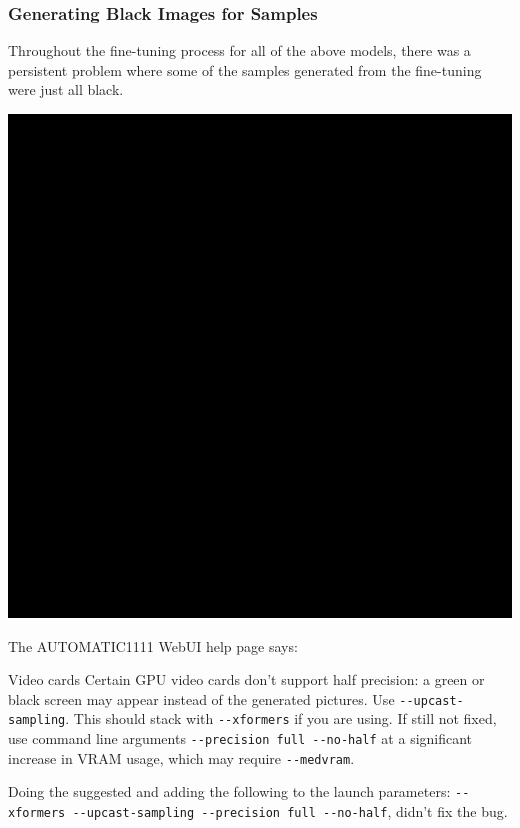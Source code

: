 \documentclass{article}
\begin{document}
\newpage
\subsubsection{Generating Black Images for Samples}
Throughout the fine-tuning process for all of the above models, there was a persistent problem where some of the samples generated from the fine-tuning were just all black.
\begin{center}
    \includegraphics[scale=0.2]{.imgs/bocchi_lora_(2)_4140.png}
\end{center}
The AUTOMATIC1111 WebUI help page says:
\begin{tcolorbox}
Video cards Certain GPU video cards don't support half precision: a green or black screen may appear instead of the generated pictures. Use \verb|--upcast-sampling|. This should stack with \verb|--xformers| if you are using. If still not fixed, use command line arguments \verb|--precision full --no-half| at a significant increase in VRAM usage, which may require \verb|--medvram|.
\end{tcolorbox}

Doing the suggested and adding the following to the launch parameters: \verb|--xformers --upcast-sampling --precision full --no-half|, didn't fix the bug.
\end{document}
